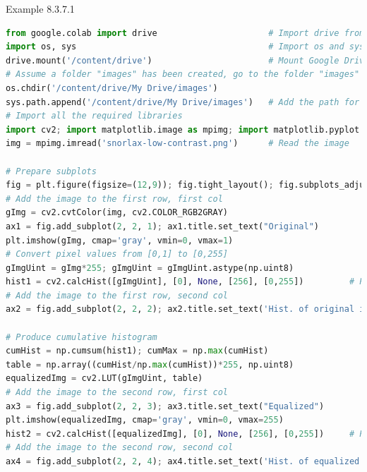 \documentclass{book}
\begin{document}
\begin{egBox}{Example 8.3.7.1}{}
    \raggedright
    \begin{lstlisting}[language=Python, basicstyle=\ttfamily\small, keywordstyle=\color{blue}, commentstyle=\color{forestgreen}, stringstyle=\color{red}, showstringspaces=false]
from google.colab import drive                      # Import drive from google.colab package
import os, sys                                      # Import os and sys modules
drive.mount('/content/drive')                       # Mount Google Drive
# Assume a folder "images" has been created, go to the folder "images"
os.chdir('/content/drive/My Drive/images')
sys.path.append('/content/drive/My Drive/images')   # Add the path for interpreter to search
# Import all the required libraries
import cv2; import matplotlib.image as mpimg; import matplotlib.pyplot as plt
img = mpimg.imread('snorlax-low-contrast.png')      # Read the image

# Prepare subplots
fig = plt.figure(figsize=(12,9)); fig.tight_layout(); fig.subplots_adjust(wspace=0.2, hspace=0.2)
# Add the image to the first row, first col
gImg = cv2.cvtColor(img, cv2.COLOR_RGB2GRAY)
ax1 = fig.add_subplot(2, 2, 1); ax1.title.set_text("Original")
plt.imshow(gImg, cmap='gray', vmin=0, vmax=1)
# Convert pixel values from [0,1] to [0,255]
gImgUint = gImg*255; gImgUint = gImgUint.astype(np.uint8)
hist1 = cv2.calcHist([gImgUint], [0], None, [256], [0,255])         # Produce histogram
# Add the image to the first row, second col                     
ax2 = fig.add_subplot(2, 2, 2); ax2.title.set_text('Hist. of original image'); plt.plot(hist1)

# Produce cumulative histogram
cumHist = np.cumsum(hist1); cumMax = np.max(cumHist)
table = np.array((cumHist/np.max(cumHist))*255, np.uint8)
equalizedImg = cv2.LUT(gImgUint, table)
# Add the image to the second row, first col
ax3 = fig.add_subplot(2, 2, 3); ax3.title.set_text("Equalized")
plt.imshow(equalizedImg, cmap='gray', vmin=0, vmax=255)
hist2 = cv2.calcHist([equalizedImg], [0], None, [256], [0,255])     # Produce histogram
# Add the image to the second row, second col                     
ax4 = fig.add_subplot(2, 2, 4); ax4.title.set_text('Hist. of equalized image'); plt.plot(hist2)


\end{lstlisting}
\end{egBox}
\end{document}
